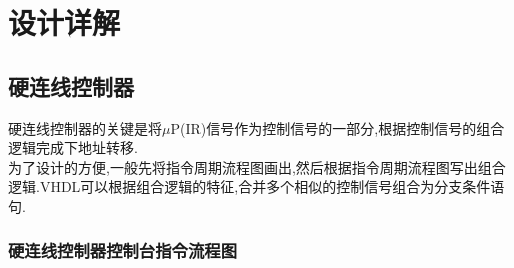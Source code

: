 \documentclass[UTF8]{ctexart}
\begin{document}
\section{设计详解}
\subsection{硬连线控制器}
硬连线控制器的关键是将$\mu \text{P}$(IR)信号作为控制信号的一部分,根据控制信号的组合逻辑完成下地址转移.\\
\indent 为了设计的方便,一般先将指令周期流程图画出,然后根据指令周期流程图写出组合逻辑.VHDL可以根据组合逻辑的特征,合并多个相似的控制信号组合为分支条件语句.
\subsubsection{硬连线控制器控制台指令流程图}
\end{document}
